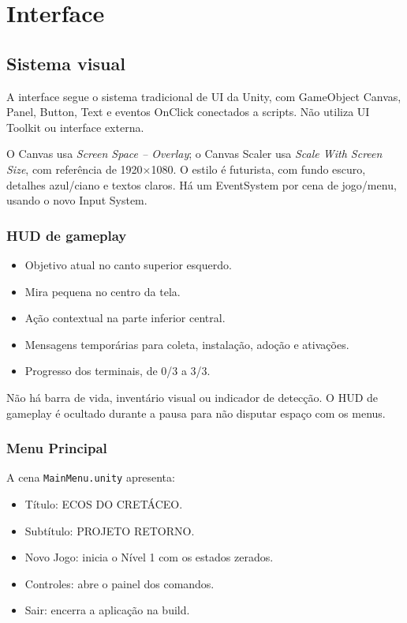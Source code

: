 \documentclass[12pt,a4paper]{article}
\begin{document}
\section{Interface}

\subsection{Sistema visual}

A interface segue o sistema tradicional de UI da Unity, com
GameObject Canvas, Panel, Button, Text e eventos OnClick conectados
a scripts. Não utiliza UI Toolkit ou interface externa.

O Canvas usa \textit{Screen Space -- Overlay}; o Canvas Scaler usa
\textit{Scale With Screen Size}, com referência de 1920$\times$1080.
O estilo é futurista, com fundo escuro, detalhes azul/ciano e textos
claros. Há um EventSystem por cena de jogo/menu, usando o novo
Input System.

\subsubsection*{HUD de gameplay}

\begin{itemize}
\item Objetivo atual no canto superior esquerdo.
\item Mira pequena no centro da tela.
\item Ação contextual na parte inferior central.
\item Mensagens temporárias para coleta, instalação, adoção e ativações.
\item Progresso dos terminais, de 0/3 a 3/3.
\end{itemize}

Não há barra de vida, inventário visual ou indicador de detecção.
O HUD de gameplay é ocultado durante a pausa para não disputar
espaço com os menus.

\subsubsection*{Menu Principal}

A cena \texttt{MainMenu.unity} apresenta:

\begin{itemize}
\item Título: ECOS DO CRETÁCEO.
\item Subtítulo: PROJETO RETORNO.
\item Novo Jogo: inicia o Nível 1 com os estados zerados.
\item Controles: abre o painel dos comandos.
\item Sair: encerra a aplicação na build.
\end{itemize}
\end{document}
